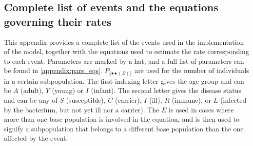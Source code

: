 \documentclass[10pt,a4paper]{article}
\begin{document}
\begin{appendices}

\section{Complete list of events and the equations governing their rates} \label{appendix:event_eqs}
This appendix provides a complete list of the events used in the implementation of the model, together with the equations used to estimate the rate corresponding to each event. Parameters are marked by a hat, and a full list of parameters can be found in \cref{appendix:pars_eqs}. $P_{\{ \bullet \bullet ( E ) \}}$ are used for the number of individuals in a certain subpopulation. The first indexing letter gives the age group and can be $A$ (adult), $Y$ (young) or $I$ (infant). The second letter gives the disease status and can be any of $S$ (susceptible), $C$ (carrier), $I$ (ill), $R$ (immune), or $L$ (infected by the bacterium, but not yet ill nor a carrier). The $E$ is used in cases where more than one base population is involved in the equation, and is then used to signify a subpopulation that belongs to a different base population than the one affected by the event.


\end{appendices}
\end{document}
